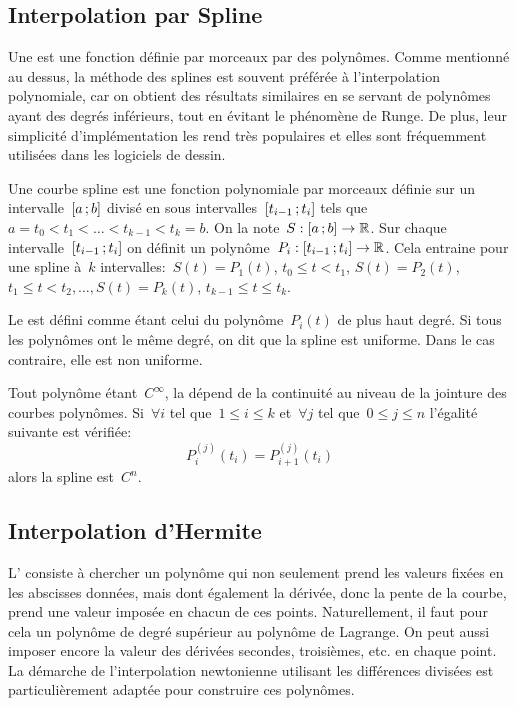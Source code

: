 \medskip
\subsection{Interpolation par Spline} 

Une  est une fonction définie par morceaux par des polynômes. Comme mentionné au dessus, la méthode des splines est souvent préférée à l'interpolation polynomiale, car on obtient des résultats similaires en se servant de polynômes ayant des degrés inférieurs, tout en évitant le phénomène de Runge. De plus, leur simplicité d'implémentation les rend très populaires et elles sont fréquemment utilisées dans les logiciels de dessin. 

Une courbe spline est une fonction polynomiale par morceaux définie sur un intervalle~$\mathopen{[}a\,;b\mathclose{]}$ divisé en sous intervalles~$\mathopen{[}t_{i-1}\,;t_i\mathclose{]}$ tels que~$a = t_0 < t_1 < \ldots < t_{k-1} < t_k = b$. On la note~$S: \mathopen{[}a\,;b\mathclose{]}\to \mathbb R$. Sur chaque intervalle~$\mathopen{[}t_{i-1}\,;t_i\mathclose{]}$ on définit un polynôme~$ P_i: \mathopen{[}t_{i-1}\,;t_i\mathclose{]} \to \mathbb R$. Cela entraine pour une spline à~$k$ intervalles:~$S(t) = P_1 (t)$, $t_0 \le t < t_1$, $S(t) = P_2 (t)$, $t_1 \le t < t_2,\ldots,S(t) = P_k (t)$, $t_{k-1} \le t \le t_k$. 

Le  est défini comme étant celui du polynôme~$P_i (t)$ de plus haut degré. Si tous les polynômes ont le même degré, on dit que la spline est uniforme. Dans le cas contraire, elle est non uniforme. 

Tout polynôme étant~$C^\infty$, la  dépend de la continuité au niveau de la jointure des courbes polynômes. Si~$\forall i$ tel que~$1 \le i \le k$ et~$\forall j$ tel que~$0 \le j \le n$ l'égalité suivante est vérifiée: 
\begin{equation}
 P_i^{(j)} (t_i) = P_{i+1}^{(j)} (t_i)
\end{equation}
alors la spline est~$C^n$. 
 
\medskip
\subsection{Interpolation d'Hermite}

L' consiste à chercher un polynôme qui non seulement prend les valeurs fixées en les abscisses données, mais dont également la dérivée, donc la pente de la courbe, prend une valeur imposée en chacun de ces points. Naturellement, il faut pour cela un polynôme de degré supérieur au polynôme de Lagrange.  On peut aussi imposer encore la valeur des dérivées secondes, troisièmes, etc. en chaque point. La démarche de l'interpolation newtonienne utilisant les différences divisées est particulièrement adaptée pour construire ces polynômes. 
 
